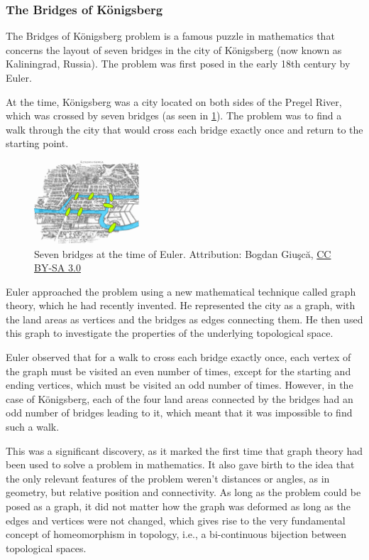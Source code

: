 \documentclass{IEEEcsmag}
\begin{document}
    \subsubsection{The Bridges of Königsberg}
      The Bridges of Königsberg problem is a famous puzzle in mathematics that concerns the layout of seven 
      bridges in the city of Königsberg (now known as Kaliningrad, Russia). The problem was first posed in the 
      early 18th century by Euler.
    
      At the time, Königsberg was a city located on both sides of the Pregel River, which was crossed by seven 
      bridges (as seen in \ref{fig:seven_bridges}). The problem was to find a walk through the city that 
      would cross each bridge exactly once and return to the starting point.

      \begin{figure}
          \centering
          \includegraphics[width=0.35\textwidth]{konig_bridges.png}
          \caption{Seven bridges at the time of Euler. Attribution:
                    Bogdan Giuşcă,
                    \href{http://creativecommons.org/licenses/by-sa/3.0/}{CC BY-SA 3.0}}
          \label{fig:seven_bridges}
      \end{figure}
    
      Euler approached the problem using a new mathematical technique called graph theory, which he had 
      recently invented. He represented the city as a graph, with the land areas as vertices and the bridges 
      as edges connecting them. He then used this graph to investigate the properties of the underlying topological space.
    
      Euler observed that for a walk to cross each bridge exactly once, each vertex of the graph must be 
      visited an even number of times, except for the starting and ending vertices, which must be visited an 
      odd number of times. However, in the case of Königsberg, each of the four land areas connected by the 
      bridges had an odd number of bridges leading to it, which meant that it was impossible to find such a 
      walk.
    
      This was a significant discovery, as it marked the first time that graph theory had been used to solve a 
      problem in mathematics. It also gave birth to the idea that the only relevant features of the problem
      weren't distances or angles, as in geometry, but relative position and connectivity. As long as the 
      problem could be posed as a graph, it did not matter how the graph was deformed as long as the edges and
      vertices were not changed, which gives rise to the very fundamental concept of homeomorphism in topology,
      i.e., a bi-continuous bijection between topological spaces.
\end{document}
